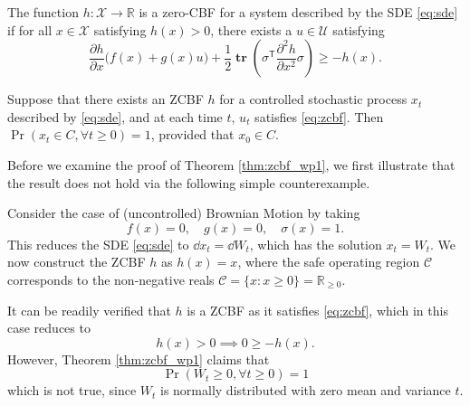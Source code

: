 \documentclass[twocolumn,amsthm]{autart}
\newcommand{\T}{^\mathsf{T}}
\DeclareMathOperator{\Tr}{\mathbf{tr}}
\newcommand*{\XSet}{\mathcal{X}}
\newcommand*{\USet}{\mathcal{U}}
\begin{document}
\begin{defn}
    The function $h : \XSet \to \mathbb{R}$ is a zero-CBF for a system described by the SDE \eqref{eq:sde} if for all $x \in \XSet$ satisfying $h(x) > 0$, there exists a $u \in \USet$ satisfying
    \begin{equation} \label{eq:zcbf}
        \frac{\partial h}{\partial x} \Big( f(x) + g(x) u\Big) + \frac{1}{2} \Tr\left(\sigma\T \frac{\partial^2 h}{\partial x^2} \sigma\right) \geq -h(x).
    \end{equation}
\end{defn}

\begin{thm} \label{thm:zcbf_wp1}
Suppose that there exists an ZCBF $h$ for a controlled stochastic process $x_t$ described by \eqref{eq:sde}, and at each time $t$, $u_t$ satisfies \eqref{eq:zcbf}. Then $\Pr(x_t \in C, \forall t\geq0) = 1$, provided that $x_0 \in C$.
\end{thm}

Before we examine the proof of Theorem \ref{thm:zcbf_wp1}, we first illustrate that the
result does not hold
via the following simple counterexample.
\begin{exmp}
    Consider the case of (uncontrolled) Brownian Motion by taking 
    \begin{equation}
        f(x) = 0, \quad g(x) = 0, \quad \sigma(x) = 1.
    \end{equation}
    This reduces the SDE \eqref{eq:sde} to $\dd{x}_t = \dd{W}_t$, which has the solution $x_t = W_t$. We now construct the ZCBF $h$ as $h(x) = x$, where the safe operating region $\mathcal{C}$ corresponds to the non-negative reals $\mathcal{C} = \{ x : x \geq 0 \} = \mathbb{R}_{\geq 0}$.

    It can be readily verified that $h$ is a ZCBF as it satisfies \eqref{eq:zcbf}, which in this case reduces to
    \begin{equation}
        h(x) > 0 \implies 0 \geq -h(x).
    \end{equation}
    However, Theorem \ref{thm:zcbf_wp1} claims that
    \begin{equation}
      \Pr(W_t \geq 0, \forall t \geq 0) = 1  
    \end{equation}
    which is not true, since $W_t$ is normally distributed with zero mean and variance $t$.
\end{exmp}
\end{document}
